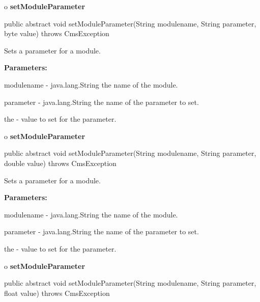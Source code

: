 o {\bf setModuleParameter} 

\begin{PRE}
 public abstract void setModuleParameter(String modulename,
                                         String parameter,
                                         byte value) throws CmsException
\end{PRE}

\begin{description}
\htmlDD Sets a parameter for a module. 

\begin{description}
\item {\bf Parameters:}  

modulename - java.lang.String the name of the module.  

parameter - java.lang.String the name of the parameter to set.  

the - value to set for the parameter.  
\end{description}

\end{description}

o {\bf setModuleParameter} 

\begin{PRE}
 public abstract void setModuleParameter(String modulename,
                                         String parameter,
                                         double value) throws CmsException
\end{PRE}

\begin{description}
\htmlDD Sets a parameter for a module. 

\begin{description}
\item {\bf Parameters:}  

modulename - java.lang.String the name of the module.  

parameter - java.lang.String the name of the parameter to set.  

the - value to set for the parameter.  
\end{description}

\end{description}

o {\bf setModuleParameter} 

\begin{PRE}
 public abstract void setModuleParameter(String modulename,
                                         String parameter,
                                         float value) throws CmsException
\end{PRE}

